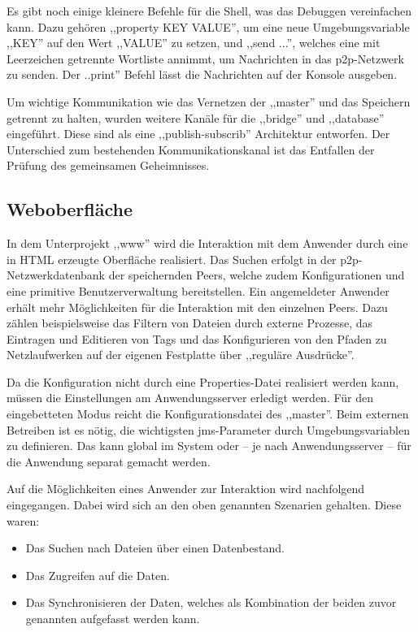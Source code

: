\documentclass[oneside, ngerman, toc=bibliography,bibliography=totoc,listof=entryprefix, open=right,numbers=noenddot,fontsize=12pt]{scrbook}
\begin{document}
Es gibt noch einige kleinere Befehle für die Shell, was das Debuggen vereinfachen kann. Dazu gehören ,,property KEY VALUE'', um eine neue Umgebungsvariable ,,KEY'' auf den Wert ,,VALUE'' zu setzen, und ,,send ...'', welches eine mit Leerzeichen getrennte Wortliste annimmt, um Nachrichten in das \acrshort{p2p}-Netzwerk zu senden. Der ..print'' Befehl lässt die Nachrichten auf der Konsole ausgeben.

Um wichtige Kommunikation wie das Vernetzen der ,,master'' und das Speichern getrennt zu halten, wurden weitere Kanäle  für die ,,bridge'' und ,,database'' eingeführt. Diese sind als eine ,,publish-subscrib'' Architektur entworfen. Der Unterschied zum bestehenden Kommunikationskanal ist das Entfallen der Prüfung des gemeinsamen Geheimnisses.



\subsection{Weboberfläche}
In dem Unterprojekt ,,www'' wird die Interaktion mit dem Anwender durch eine in HTML erzeugte Oberfläche realisiert.
Das Suchen erfolgt in der \acrshort{p2p}-Netzwerkdatenbank der speichernden Peers, welche zudem Konfigurationen und eine primitive Benutzerverwaltung bereitstellen.
Ein angemeldeter Anwender erhält mehr Möglichkeiten für die Interaktion mit den einzelnen Peers. Dazu zählen beispielsweise das Filtern von Dateien durch externe Prozesse, das Eintragen und Editieren von Tags und das Konfigurieren von den Pfaden zu Netzlaufwerken auf der eigenen Festplatte über ,,reguläre Ausdrücke''.

Da die Konfiguration nicht durch eine Properties-Datei realisiert werden kann, müssen die Einstellungen am Anwendungsserver erledigt werden. Für den eingebetteten Modus reicht die Konfigurationsdatei des ,,master''. Beim externen Betreiben ist es nötig, die wichtigsten \acrshort{jms}-Parameter durch Umgebungsvariablen zu definieren. Das kann global im System oder -- je nach Anwendungsserver -- für die Anwendung separat gemacht werden.

Auf die Möglichkeiten eines Anwender zur Interaktion wird nachfolgend eingegangen.
Dabei wird sich an den oben genannten Szenarien gehalten. Diese waren:

\begin{itemize}
    \item Das Suchen nach Dateien über einen Datenbestand.
    \item Das Zugreifen auf die Daten.
    \item Das Synchronisieren der Daten, welches als Kombination der beiden zuvor genannten aufgefasst werden kann.
\end{itemize}
\end{document}

